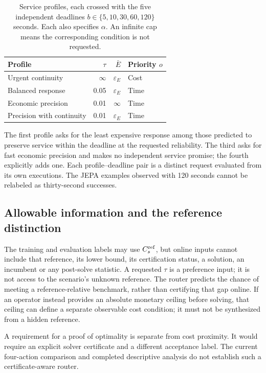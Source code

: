\begin{table}[htbp]
\centering\small
\caption{Service profiles, each crossed with the five independent deadlines
$b\in\{5,10,30,60,120\}$ seconds. Each also specifies $\alpha$.
An infinite cap means the corresponding condition is not requested.}
\label{tab:profiles}
\begin{tabular}{p{.35\linewidth}rrl}
\toprule
Profile & $\tau$ & $\bar E$ & Priority $o$\\
\midrule
Urgent continuity & $\infty$ & $\varepsilon_E$ & Cost\\
Balanced response & 0.05 & $\varepsilon_E$ & Time\\
Economic precision & 0.01 & $\infty$ & Time\\
Precision with continuity & 0.01 & $\varepsilon_E$ & Time\\
\bottomrule
\end{tabular}
\end{table}

The first profile asks for the least expensive response among those predicted
to preserve service within the deadline at the requested reliability.
The third asks for fast economic precision and makes no independent service
promise; the fourth explicitly adds one. Each profile--deadline pair is a
distinct request evaluated from its own executions. The JEPA examples observed
with 120 seconds cannot be relabeled as thirty-second successes.

\subsection{Allowable information and the reference distinction}
The training and evaluation labels may use $C_s^{\rm ref}$, but online inputs
cannot include that reference, its lower bound, its certification status,
a solution, an incumbent or any post-solve statistic. A requested $\tau$ is
a preference input; it is not access to the scenario's unknown reference.
The router predicts the chance of meeting a reference-relative benchmark,
rather than certifying that gap online. If an operator instead provides an
absolute monetary ceiling before solving, that ceiling can define a separate
observable cost condition; it must not be synthesized from a hidden reference.

A requirement for a proof of optimality is separate from cost proximity.
It would require an explicit solver certificate and a different acceptance
label. The current four-action comparison and completed descriptive analysis do not
establish such a certificate-aware router.

